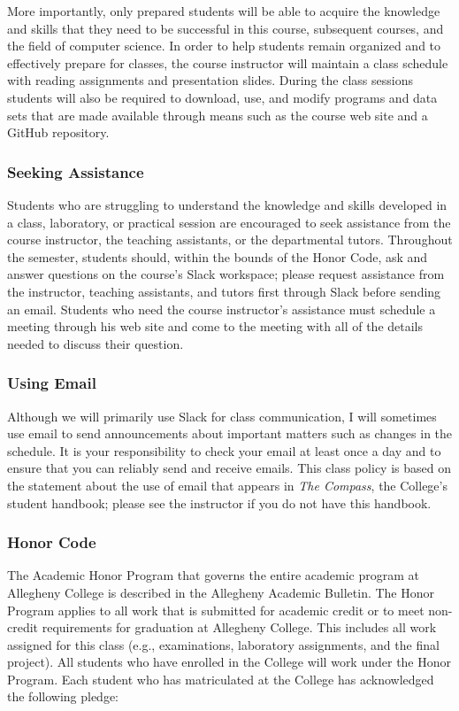 \documentclass[11pt]{article}
\newcommand{\instructorpronoun}[1]{his}
\begin{document}
More importantly, only prepared students will be able to acquire the knowledge
and skills that they need to be successful in this course, subsequent courses,
and the field of computer science. In order to help students remain organized
and to effectively prepare for classes, the course instructor will maintain a
class schedule with reading assignments and presentation slides. During the
class sessions students will also be required to download, use, and modify
programs and data sets that are made available through means such as the course
web site and a GitHub repository.

\subsubsection*{Seeking Assistance}

Students who are struggling to understand the knowledge and skills developed in
a class, laboratory, or practical session are encouraged to seek assistance from
the course instructor, the teaching assistants, or the departmental tutors.
Throughout the semester, students should, within the bounds of the Honor Code,
ask and answer questions on the course's Slack workspace; please request
assistance from the instructor, teaching assistants, and tutors first through
Slack before sending an email. Students who need the course instructor's
assistance must schedule a meeting through \instructorpronoun{} web site and
come to the meeting with all of the details needed to discuss their question.

\subsubsection*{Using Email}

Although we will primarily use Slack for class communication, I will sometimes
use email to send announcements about important matters such as changes in the
schedule. It is your responsibility to check your email at least once a day and
to ensure that you can reliably send and receive emails. This class policy is
based on the statement about the use of email that appears in {\em The Compass},
the College's student handbook; please see the instructor if you do not have
this handbook.

\subsubsection*{Honor Code}

The Academic Honor Program that governs the entire academic program at Allegheny
College is described in the Allegheny Academic Bulletin. The Honor Program
applies to all work that is submitted for academic credit or to meet non-credit
requirements for graduation at Allegheny College. This includes all work
assigned for this class (e.g., examinations, laboratory assignments, and the
final project). All students who have enrolled in the College will work under
the Honor Program. Each student who has matriculated at the College has
acknowledged the following pledge:
\end{document}
